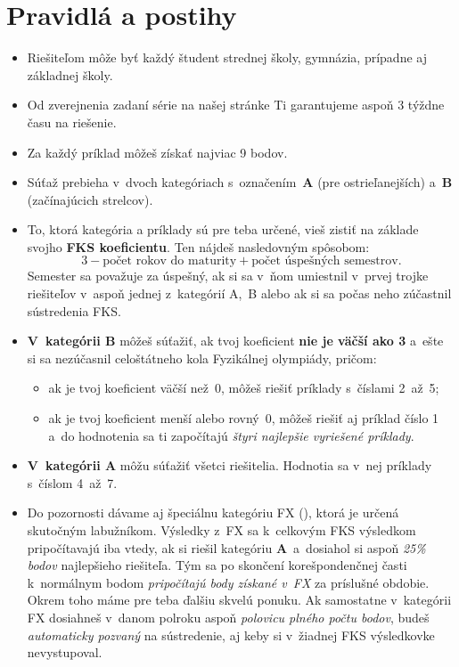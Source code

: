 \pagestyle{rules}

\section{Pravidlá a postihy}
    \begin{itemize}
        \item Riešiteľom môže byť každý študent strednej školy, gymnázia, prípadne aj základnej školy.
        
        \item Od zverejnenia zadaní série na našej stránke Ti garantujeme aspoň 3 týždne času na riešenie.
    
        \item Za každý príklad môžeš získať najviac 9 bodov. 
    
        \item Súťaž prebieha v~dvoch kategóriach s~označením~\textbf{A} (pre ostrieľanejších) a~\textbf{B} (začínajúcich strelcov).
    
        \item To, ktorá kategória a príklady sú pre teba určené, vieš zistiť na základe svojho \textbf{FKS koeficientu}. 
            Ten nájdeš nasledovným spôsobom:
            $$3 - \text{počet rokov do maturity} + \text{počet úspešných semestrov.}$$
            Semester sa považuje za úspešný, ak si sa v~ňom umiestnil v~prvej trojke riešiteľov v~aspoň jednej z~kategórií A,~B 
            alebo ak si sa počas neho zúčastnil sústredenia FKS.
        
        \item \textbf{V~kategórii B} môžeš súťažiť, ak tvoj koeficient \textbf{nie je väčší ako 3} 
            a~ešte si sa nezúčasnil celoštátneho kola Fyzikálnej olympiády, pričom:
            \begin{itemize}
                \item ak je tvoj koeficient väčší než~0, môžeš riešiť príklady s~číslami 2~až~5;
                \item ak je tvoj koeficient menší alebo rovný~0, môžeš riešiť aj príklad číslo 1 a~do hodnotenia sa ti započítajú \emph{štyri najlepšie vyriešené príklady}.
            \end{itemize}
    
        \item \textbf{V~kategórii A} môžu súťažiť všetci riešitelia. Hodnotia sa v~nej príklady s~číslom 4~až~7.
    
        \item Do pozornosti dávame aj špeciálnu kategóriu FX (),
            ktorá je určená skutočným labužníkom. Výsledky z~FX sa k~celkovým FKS výsledkom 
            pripočítavajú iba vtedy, ak si riešil kategóriu \textbf{A}~a~dosiahol si aspoň \emph{25\% bodov} najlepšieho riešiteľa.
            Tým sa po skončení korešpondenčnej časti k~normálnym bodom \emph{pripočítajú body
            získané v~FX} za príslušné obdobie. Okrem toho máme pre teba ďalšiu skvelú ponuku.
            Ak samostatne v~kategórii FX dosiahneš v~danom polroku aspoň \emph{polovicu plného počtu
            bodov}, budeš \emph{automaticky pozvaný} na sústredenie, aj keby si v~žiadnej FKS
            výsledkovke nevystupoval.
    

\end{itemize}
